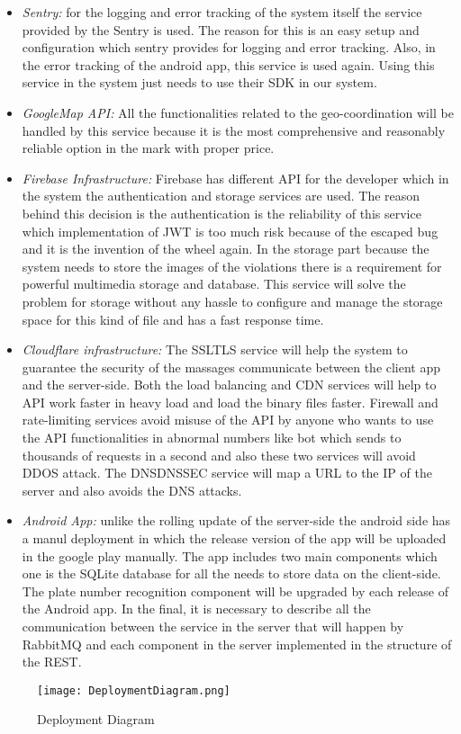 \begin{itemize}
\item \emph{Sentry:} for the logging and error tracking of the system itself the service provided by the Sentry is used. The reason for this is an easy setup and configuration which sentry provides for logging and error tracking. Also, in the error tracking of the android app, this service is used again. Using this service in the system just needs to use their SDK in our system.
\item \emph{GoogleMap API:} All the functionalities related to the geo-coordination will be handled by this service because it is the most comprehensive and reasonably reliable option in the mark with proper price.
\item \emph{Firebase Infrastructure:} Firebase has different API for the developer which in the system the authentication and storage services are used. The reason behind this decision is the authentication is the reliability of this service which implementation of JWT is too much risk because of the escaped bug and it is the invention of the wheel again. In the storage part because the system needs to store the images of the violations there is a requirement for powerful multimedia storage and database. This service will solve the problem for storage without any hassle to configure and manage the storage space for this kind of file and has a fast response time.
\item \emph{Cloudflare infrastructure:} The SSL\/TLS service will help the system to guarantee the security of the massages communicate between the client app and the server-side. Both the load balancing and CDN services will help to API work faster in heavy load and load the binary files faster. Firewall and rate-limiting services avoid misuse of the API by anyone who wants to use the API functionalities in abnormal numbers like bot which sends to thousands of requests in a second and also these two services will avoid DDOS attack. The DNS\/DNSSEC service will map a URL to the IP of the server and also avoids the DNS attacks.
\item \emph{Android App:} unlike the rolling update of the server-side the android side has a manul deployment in which the release version of the app will be uploaded in the google play manually. The app includes two main components which one is the SQLite database for all the needs to store data on the client-side. The plate number recognition component will be upgraded by each release of the Android app.
In the final, it is necessary to describe all the communication between the service in the server that will happen by RabbitMQ and each component in the server implemented in the structure of the REST.
\end{itemize}
\begin{figure}[H]
\caption{Deployment Diagram}
\label{fig:Deployment}
\centering
\texttt{[image: DeploymentDiagram.png]}
\end{figure}
